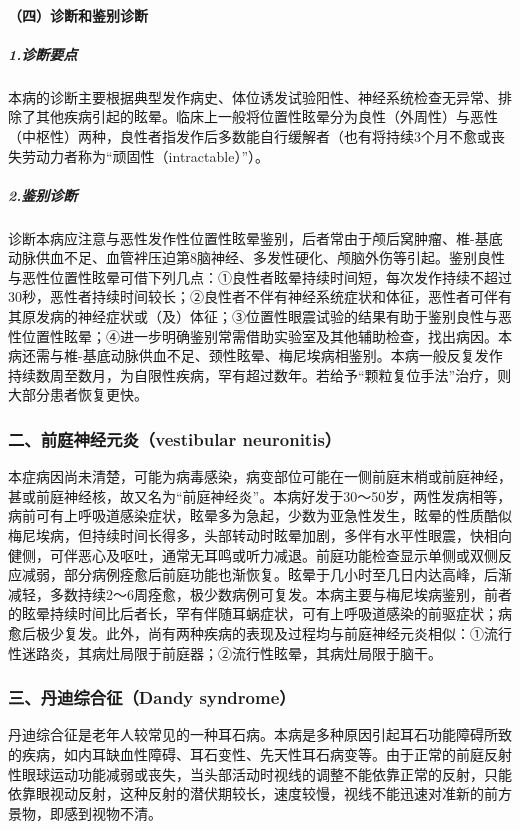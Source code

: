 \paragraph{（四）诊断和鉴别诊断}

\subparagraph{1.诊断要点}

本病的诊断主要根据典型发作病史、体位诱发试验阳性、神经系统检查无异常、排除了其他疾病引起的眩晕。临床上一般将位置性眩晕分为良性（外周性）与恶性（中枢性）两种，良性者指发作后多数能自行缓解者（也有将持续3个月不愈或丧失劳动力者称为“顽固性（intractable）”）。

\subparagraph{2.鉴别诊断}

诊断本病应注意与恶性发作性位置性眩晕鉴别，后者常由于颅后窝肿瘤、椎-基底动脉供血不足、血管袢压迫第8脑神经、多发性硬化、颅脑外伤等引起。鉴别良性与恶性位置性眩晕可借下列几点：①良性者眩晕持续时间短，每次发作持续不超过30秒，恶性者持续时间较长；②良性者不伴有神经系统症状和体征，恶性者可伴有其原发病的神经症状或（及）体征；③位置性眼震试验的结果有助于鉴别良性与恶性位置性眩晕；④进一步明确鉴别常需借助实验室及其他辅助检查，找出病因。本病还需与椎-基底动脉供血不足、颈性眩晕、梅尼埃病相鉴别。本病一般反复发作持续数周至数月，为自限性疾病，罕有超过数年。若给予“颗粒复位手法”治疗，则大部分患者恢复更快。

\subsubsection{二、前庭神经元炎（vestibular neuronitis）}

本症病因尚未清楚，可能为病毒感染，病变部位可能在一侧前庭末梢或前庭神经，甚或前庭神经核，故又名为“前庭神经炎”。本病好发于30～50岁，两性发病相等，病前可有上呼吸道感染症状，眩晕多为急起，少数为亚急性发生，眩晕的性质酷似梅尼埃病，但持续时间长得多，头部转动时眩晕加剧，多伴有水平性眼震，快相向健侧，可伴恶心及呕吐，通常无耳鸣或听力减退。前庭功能检查显示单侧或双侧反应减弱，部分病例痊愈后前庭功能也渐恢复。眩晕于几小时至几日内达高峰，后渐减轻，多数持续2～6周痊愈，极少数病例可复发。本病主要与梅尼埃病鉴别，前者的眩晕持续时间比后者长，罕有伴随耳蜗症状，可有上呼吸道感染的前驱症状；病愈后极少复发。此外，尚有两种疾病的表现及过程均与前庭神经元炎相似：①流行性迷路炎，其病灶局限于前庭器；②流行性眩晕，其病灶局限于脑干。

\subsubsection{三、丹迪综合征（Dandy syndrome）}

丹迪综合征是老年人较常见的一种耳石病。本病是多种原因引起耳石功能障碍所致的疾病，如内耳缺血性障碍、耳石变性、先天性耳石病变等。由于正常的前庭反射性眼球运动功能减弱或丧失，当头部活动时视线的调整不能依靠正常的反射，只能依靠眼视动反射，这种反射的潜伏期较长，速度较慢，视线不能迅速对准新的前方景物，即感到视物不清。


